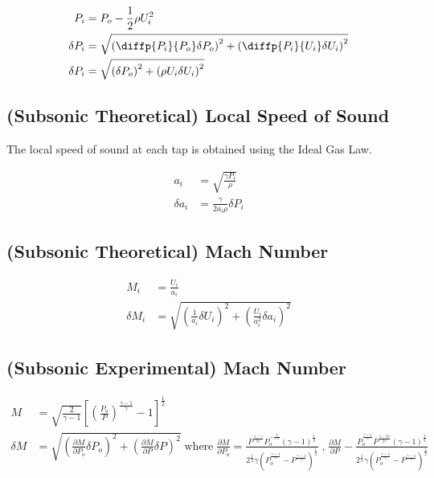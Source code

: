 \documentclass[runningheads]{llncs}
\begin{document}
\begin{align*}
    P_i &= P_o - \frac{1}{2} \rho U_i^2\\
    \delta P_i &= \sqrt{\left(\diffp{{P_i}}{{P_o}} \delta P_o\right)^2 + \left(\diffp{{P_i}}{{U_i}} \delta U_i \right)^2}\\
    \delta P_i &= \sqrt{\left(\delta P_o\right)^2 + \left(\rho U_i \delta U_i \right)^2}
\end{align*}

\subsection{(Subsonic Theoretical) Local Speed of Sound}

The local speed of sound at each tap is obtained using the Ideal Gas Law.

\begin{align*}
    a_i &= \sqrt{\frac{\gamma P_i}{\rho}}\\
    \delta a_i &= \frac{\gamma}{2 a_i \rho} \delta P_i
\end{align*}

\subsection{(Subsonic Theoretical) Mach Number}
\begin{align*}
    M_i &= \frac{U_i}{a_i}\\
    \delta M_i &= \sqrt{(\tfrac{1}{a_i} \delta U_i)^2 + (\tfrac{U_i}{a_i^2} \delta a_i)^2}
\end{align*}

\subsection{(Subsonic Experimental) Mach Number}

\begin{align*}
    M &= \sqrt{\frac{2}{\gamma - 1}}\left[\left(\frac{P_o}{P}\right)^\frac{\gamma - 1}{\gamma} - 1\right]^{\frac{1}{2}} \\
    \delta M &= \sqrt{\left(\frac{\partial M}{\partial P_o}\delta P_o\right)^2 + \left(\frac{\partial M}{\partial P}\delta P\right)^2}\;\text{where}\;
    \frac{\partial M}{\partial P_o} = \frac{P^\frac{1 - \gamma}{2\gamma}P_o^{- \frac{1}{-\gamma}}(\gamma - 1)^\frac{1}{2}}{2^\frac{1}{2}\gamma\left(P_o^\frac{\gamma - 1}{\gamma} - P^\frac{\gamma - 1}{\gamma}\right)^\frac{1}{2}}\;\text{,}\;\frac{\partial M}{\partial P} -\frac{P_o^\frac{\gamma - 1}{\gamma}P^\frac{1 - 3\gamma}{2\gamma}(\gamma - 1)^\frac{1}{2}}{2^\frac{1}{2}\gamma\left(P_o^\frac{\gamma - 1}{\gamma} - P^\frac{\gamma - 1}{\gamma}\right)^\frac{1}{2}}
\end{align*}
\end{document}
